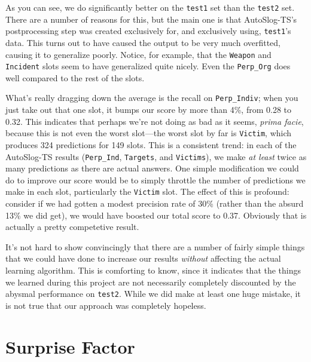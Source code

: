 \documentclass[11pt]{myclass}
\begin{document}
As you can see, we do significantly better on the \texttt{test1} set than the \texttt{test2} set. There are a number of reasons for this, but the main one is that AutoSlog-TS's postprocessing step was created exclusively for, and exclusively using, \texttt{test1}'s data. This turns out to have caused the output to be very much overfitted, causing it to generalize poorly. Notice, for example, that the \texttt{Weapon} and \texttt{Incident} slots seem to have generalized quite nicely. Even the \texttt{Perp\_Org} does well compared to the rest of the slots.

What's really dragging down the average is the recall on \texttt{Perp\_Indiv}; when you just take out that one slot, it bumps our score by more than 4\%, from 0.28 to 0.32. This indicates that perhaps we're not doing as bad as it seems, \textit{prima facie}, because this is not even the worst slot---the worst slot by far is \texttt{Victim}, which produces 324 predictions for 149 slots. This is a consistent trend: in each of the AutoSlog-TS results (\texttt{Perp\_Ind}, \texttt{Targets}, and \texttt{Victims}), we make \textit{at least} twice as many predictions as there are actual answers. One simple modification we could do to improve our score would be to simply throttle the number of predictions we make in each slot, particularly the \texttt{Victim} slot. The effect of this is profound: consider if we had gotten a modest precision rate of 30\% (rather than the absurd 13\% we did get), we would have boosted our total score to 0.37. Obviously that is actually a pretty competetive result.

It's not hard to show convincingly that there are a number of fairly simple things that we could have done to increase our results \textit{without} affecting the actual learning algorithm. This is comforting to know, since it indicates that the things we learned during this project are not necessarily completely discounted by the abysmal performance on \texttt{test2}. While we did make at least one huge mistake, it is not true that our approach was completely hopeless.




\section{Surprise Factor}
\end{document}
